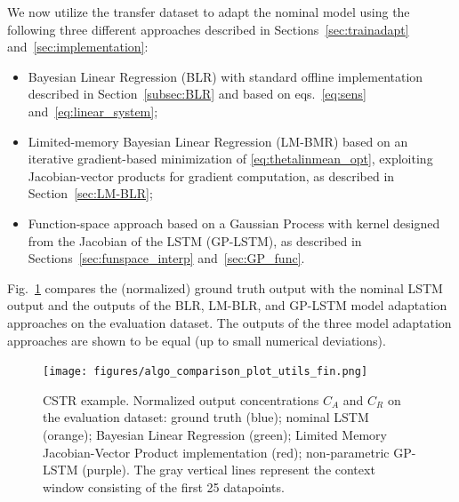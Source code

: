 \documentclass{article}
\begin{document}
We now utilize the transfer dataset to adapt the nominal model using the following three different approaches described in Sections~\ref{sec:trainadapt}  and~\ref{sec:implementation}: 
\begin{itemize}
    \item Bayesian Linear Regression (BLR) with standard offline implementation described in Section~\ref{subsec:BLR} 
    and based on  eqs.~\eqref{eq:sens} and~\eqref{eq:linear_system};
    \item Limited-memory Bayesian Linear Regression (LM-BMR) based on an iterative gradient-based minimization of \eqref{eq:thetalinmean_opt}, exploiting Jacobian-vector products for gradient computation, as described in Section~\ref{sec:LM-BLR};
    \item Function-space approach based on a Gaussian Process with  kernel designed from the Jacobian of the LSTM (GP-LSTM), as described in Sections~\ref{sec:funspace_interp} and~\ref{sec:GP_func}. 
\end{itemize}


 Fig.~\ref{LSTM-compare1} compares the (normalized) ground truth output with the nominal LSTM output and 
 the outputs of the BLR, LM-BLR, and GP-LSTM model adaptation approaches on the evaluation dataset. The 
 outputs of the three model adaptation approaches are shown to be equal (up to small numerical deviations). 

 \begin{figure}%
    \centering
    \texttt{[image: figures/algo\_comparison\_plot\_utils\_fin.png]}
    \caption{ CSTR example. Normalized output concentrations $C_A$ and $C_R$ on the evaluation dataset: ground truth (blue); nominal LSTM (orange);   Bayesian Linear Regression (green); Limited Memory Jacobian-Vector Product implementation (red); non-parametric GP-LSTM (purple). The gray vertical lines represent the context window consisting of the first 25 datapoints.} 
    \label{LSTM-compare1}
\end{figure}
\end{document}
